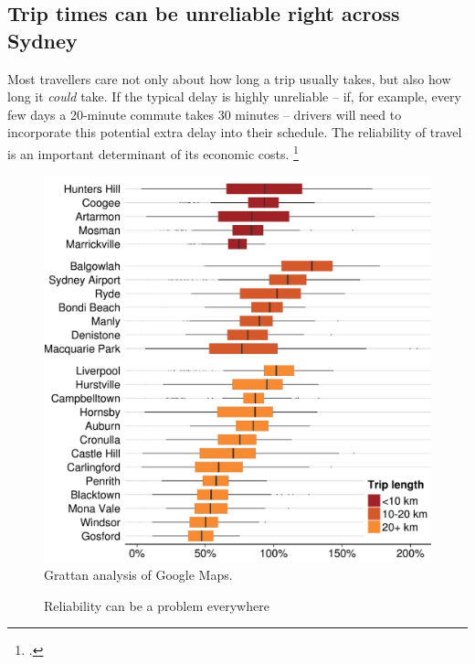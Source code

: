 \documentclass{grattan}
\begin{document}
\subsection{Trip times can be unreliable right across Sydney}

Most travellers care not only about how long a trip usually takes, but also how long it \emph{could} take.
If the typical delay is highly unreliable -- if, for example, every few days a 20-minute commute takes 30 minutes -- drivers will need to incorporate this potential extra delay into their schedule.
The reliability of travel is an important determinant of its economic costs.%
\footcites{2005-Small-estimates-for-travel-time-and-reliability}{2017-Brent-and-Gross-value-of-travel-time-and-reliability}

\begin{figure}
\caption{Reliability can be a problem everywhere\label{fig:boxplot-variability-by-route}}
\includegraphics{atlas/boxplot-increase_in_travel_time-by-Suburb--Sydney-CBD-commutes-1.pdf}
%
{Grattan analysis of Google Maps.}
\end{figure}
\end{document}
